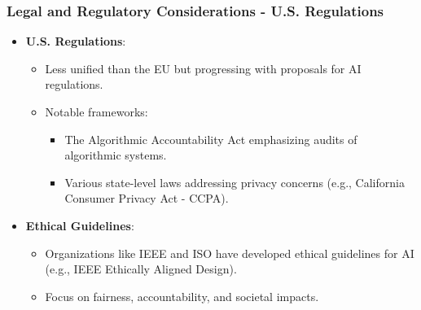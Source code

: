 \documentclass{beamer}
\begin{document}
\begin{frame}[fragile]
    \frametitle{Legal and Regulatory Considerations - U.S. Regulations}
    \begin{itemize}
        \item \textbf{U.S. Regulations}:
        \begin{itemize}
            \item Less unified than the EU but progressing with proposals for AI regulations.
            \item Notable frameworks:
            \begin{itemize}
                \item The Algorithmic Accountability Act emphasizing audits of algorithmic systems.
                \item Various state-level laws addressing privacy concerns (e.g., California Consumer Privacy Act - CCPA).
            \end{itemize}
        \end{itemize}
        
        \item \textbf{Ethical Guidelines}:
        \begin{itemize}
            \item Organizations like IEEE and ISO have developed ethical guidelines for AI (e.g., IEEE Ethically Aligned Design).
            \item Focus on fairness, accountability, and societal impacts.
        \end{itemize}
    \end{itemize}
\end{frame}
\end{document}
